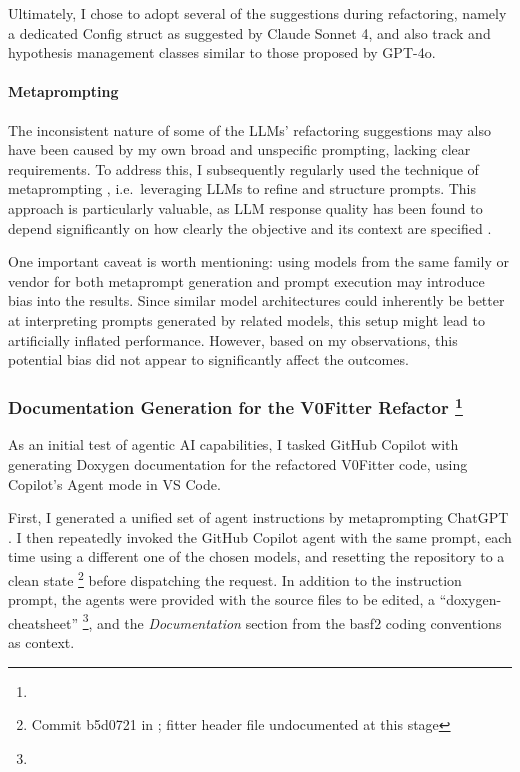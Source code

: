 Ultimately, I chose to adopt several of the suggestions during refactoring, namely a dedicated Config struct as suggested by Claude Sonnet 4, and also track and hypothesis management classes similar to those proposed by GPT-4o.

\paragraph{Metaprompting}
The inconsistent nature of some of the LLMs' refactoring suggestions may also have been caused by my own broad and unspecific prompting, lacking clear requirements.
To address this, I subsequently regularly used the technique of metaprompting \cite{metaprompting}, i.e.\ leveraging LLMs to refine and structure prompts.
This approach is particularly valuable, as LLM response quality has been found to depend significantly on how clearly the objective and its context are specified \cite{prompt-quality}.

One important caveat is worth mentioning: using models from the same family or vendor for both metaprompt generation and prompt execution may introduce bias into the results.
Since similar model architectures could inherently be better at interpreting prompts generated by related models, this setup might lead to artificially inflated performance.
However, based on my observations, this potential bias did not appear to significantly affect the outcomes.

\def\sectitle{Documentation Generation for the V0Fitter Refactor}
\subsubsection%
[\sectitle]
{\sectitle
  \footnote{}
}
As an initial test of agentic AI capabilities, I tasked GitHub Copilot with generating Doxygen documentation \cite{doxygen} for the refactored V0Fitter code, using Copilot's Agent mode in VS Code.

First, I generated a unified set of agent instructions by metaprompting ChatGPT \cite{chatgpt}.
I then repeatedly invoked the GitHub Copilot agent with the same prompt, each time using a different one of the chosen models, and resetting the repository to a clean state%
\footnote{Commit b5d0721 in ; fitter header file undocumented at this stage}
before dispatching the request.
In addition to the instruction prompt, the agents were provided with the source files to be edited, a \enquote{doxygen-cheatsheet}%
\footnote{
}, 
and the \emph{Documentation} section from the basf2 coding conventions \cite{basf2-coding-conventions} as context.

